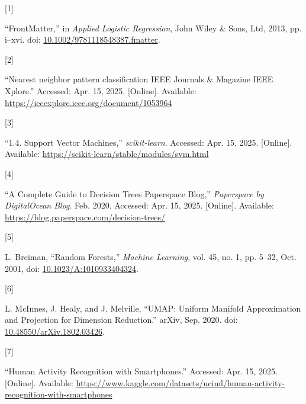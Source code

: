 \documentclass[
]{article}
\newlength{\cslhangindent}
\newlength{\csllabelwidth}
\newenvironment{CSLReferences}[2] %
 {\begin{list}{}{%
  \setlength{\itemindent}{0pt}
  \setlength{\leftmargin}{0pt}
  \setlength{\parsep}{0pt}
  \ifodd #1
   \setlength{\leftmargin}{\cslhangindent}
   \setlength{\itemindent}{-1\cslhangindent}
  \fi
  \setlength{\itemsep}{#2\baselineskip}}}
 {\end{list}}
\newcommand{\CSLLeftMargin}[1]{\parbox[t]{\csllabelwidth}{\strut#1\strut}}
\newcommand{\CSLRightInline}[1]{\parbox[t]{\linewidth - \csllabelwidth}{\strut#1\strut}}
\begin{document}
\label{refs}
\begin{CSLReferences}{0}{0}
\CSLLeftMargin{{[}1{]} }%
\CSLRightInline{{``{FrontMatter},''} in \emph{Applied {Logistic}
{Regression}}, John Wiley \& Sons, Ltd, 2013, pp. i--xvi. doi:
\href{https://doi.org/10.1002/9781118548387.fmatter}{10.1002/9781118548387.fmatter}.}

\CSLLeftMargin{{[}2{]} }%
\CSLRightInline{{``Nearest neighbor pattern classification {\textbar}
{IEEE} {Journals} \& {Magazine} {\textbar} {IEEE} {Xplore}.''} Accessed:
Apr. 15, 2025. {[}Online{]}. Available:
\url{https://ieeexplore.ieee.org/document/1053964}}

\CSLLeftMargin{{[}3{]} }%
\CSLRightInline{{``1.4. {Support} {Vector} {Machines},''}
\emph{scikit-learn}. Accessed: Apr. 15, 2025. {[}Online{]}. Available:
\url{https://scikit-learn/stable/modules/svm.html}}

\CSLLeftMargin{{[}4{]} }%
\CSLRightInline{{``A {Complete} {Guide} to {Decision} {Trees} {\textbar}
{Paperspace} {Blog},''} \emph{Paperspace by DigitalOcean Blog}. Feb.
2020. Accessed: Apr. 15, 2025. {[}Online{]}. Available:
\url{https://blog.paperspace.com/decision-trees/}}

\CSLLeftMargin{{[}5{]} }%
\CSLRightInline{L. Breiman, {``Random {Forests},''} \emph{Machine
Learning}, vol. 45, no. 1, pp. 5--32, Oct. 2001, doi:
\href{https://doi.org/10.1023/A:1010933404324}{10.1023/A:1010933404324}.}

\CSLLeftMargin{{[}6{]} }%
\CSLRightInline{L. McInnes, J. Healy, and J. Melville, {``{UMAP}:
{Uniform} {Manifold} {Approximation} and {Projection} for {Dimension}
{Reduction}.''} arXiv, Sep. 2020. doi:
\href{https://doi.org/10.48550/arXiv.1802.03426}{10.48550/arXiv.1802.03426}.}

\CSLLeftMargin{{[}7{]} }%
\CSLRightInline{{``Human {Activity} {Recognition} with {Smartphones}.''}
Accessed: Apr. 15, 2025. {[}Online{]}. Available:
\url{https://www.kaggle.com/datasets/uciml/human-activity-recognition-with-smartphones}}

\end{CSLReferences}
\end{document}
